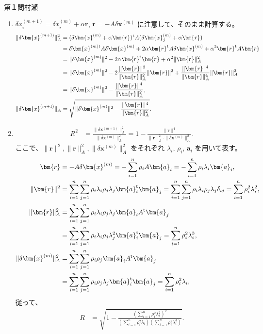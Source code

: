 \begin{answer}{第１問}{村瀬}
\begin{enumerate}
\item
  $\delta x_i^{(m+1)} = \delta x_i^{(m)} + \alpha\bm{r}$,
  $\bm{r} = -A\delta\bm{x}^{(m)}$ に注意して、そのまま計算する。
  \begin{align*}
    \|\delta\bm{x}^{(m+1)}\|^2_A
      &= (\delta\bm{x}^{(m)} + \alpha\bm{r})\transpose A(\delta\bm{x}_j^{(m)} + \alpha\bm{r})\\
      &= \delta\bm{x}^{(m)\mathrm{t}} A\delta\bm{x}^{(m)}
        + 2\alpha\bm{r}\transpose A \delta\bm{x}^{(m)}
        + \alpha^2 \bm{r}\transpose A\bm{r}\\
      &= \|\delta\bm{x}^{(m)}\|^2
        - 2\alpha \bm{r}\transpose \bm{r} + \alpha^2 \|\bm{r}\|^2_A\\
      &= \|\delta\bm{x}^{(m)}\|^2
        - 2 \frac{\|\bm{r}\|^2}{\|\bm{r}\|_A^2}\|\bm{r}\|^2
        + \frac{\|\bm{r}\|^4}{\|\bm{r}\|_A^4} \|\bm{r}\|^2_A\\
      &= \|\delta\bm{x}^{(m)}\|^2
        - \frac{\|\bm{r}\|^4}{\|\bm{r}\|_A^2},\\
    \|\delta\bm{x}^{(m+1)}\|_A
      &= \sqrt{\|\delta\bm{x}^{(m)}\|^2
        - \frac{\|\bm{r}\|^4}{\|\bm{r}\|_A^2}}.
  \end{align*}

\item
  \def\nsum#1{\sum_{#1=1}^n}
  \begin{align*}
    R^2 &= \frac{\|\delta\bm{x}^{(m+1)}\|^2_A}{\|\delta\bm{x}^{(m)}\|^2_A}
      = 1 -\frac{\|\bm{r}\|^4}{\|\bm{r}\|_A^2 \cdot\|\delta\bm{x}^{(m)}\|^2_A}.
  \end{align*}
  ここで、$\|\bm{r}\|^2, \|\bm{r}\|_A^2, \|\delta\bm{x}^{(m)}\|^2_A$ をそれぞれ $\lambda_i,\,\rho_i,\,\bm{a}_i$ を用いて表す。
  \begin{align*}
    \bm{r} &= -A \delta\bm{x}^{(m)} = -\nsum{i}\rho_i A\bm{a}_i = -\nsum{i}\rho_i \lambda_i \bm{a}_i,\\
    \|\bm{r}\|^2
      &= \nsum{i}\nsum{j} \rho_i\lambda_i \rho_j\lambda_j \bm{a}_i\transpose\bm{a}_j 
       = \nsum{i}\nsum{j} \rho_i\lambda_i \rho_j\lambda_j \delta_{ij} = \nsum{i} \rho_i^2 \lambda_i^2,\\
    \|\bm{r}\|^2_A
      &= \nsum{i}\nsum{j} \rho_i\lambda_i \rho_j\lambda_j \bm{a}_i A\transpose\bm{a}_j \\
      &= \nsum{i}\nsum{j} \rho_i\lambda_i \rho_j\lambda_j^2 \bm{a}_i \transpose\bm{a}_j
       = \nsum{i} \rho_i^2 \lambda_i^3,\\
    \|\delta\bm{x}^{(m)}\|^2_A
      &= \nsum{i}\nsum{j} \rho_i \rho_j \bm{a}_i A\transpose\bm{a}_j \\
      &= \nsum{i}\nsum{j} \rho_i \rho_j \lambda_j \bm{a}_i \transpose\bm{a}_j
       = \nsum{i} \rho_i^2 \lambda_i,\\
  \end{align*}
  従って、
  \begin{align*}
    R &= \sqrt{
      1 -\frac{\left(\nsum{i} \rho_i^2\lambda_i^2\right)^2}{
        \left(\nsum{i} \rho_i^2\lambda_i\right)
        \left(\nsum{i} \rho_i^2\lambda_i^3\right)}
    }.
  \end{align*}


\end{enumerate}
\end{answer}
